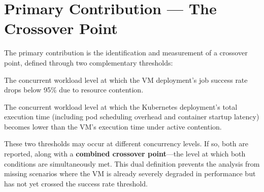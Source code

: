 
\section{Primary Contribution --- The Crossover Point}
\label{sec:crossover-point}

The primary contribution is the identification and measurement of a crossover point, defined through two complementary thresholds:

\begin{description}[style=nextline]
  \item[Reliability crossover] The concurrent workload level at which the VM deployment's job success rate drops below 95\% due to resource contention.
  \item[Performance crossover] The concurrent workload level at which the Kubernetes deployment's total execution time (including pod scheduling overhead and container startup latency) becomes lower than the VM's execution time under active contention.
\end{description}

These two thresholds may occur at different concurrency levels. If so, both are reported, along with a \textbf{combined crossover point}---the level at which both conditions are simultaneously met. This dual definition prevents the analysis from missing scenarios where the VM is already severely degraded in performance but has not yet crossed the success rate threshold.
